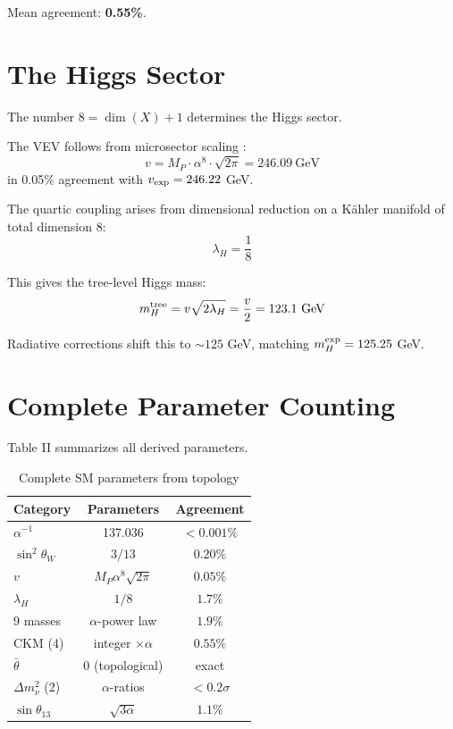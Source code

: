 \documentclass[aps,prl,twocolumn,superscriptaddress]{revtex4-2}
\begin{document}
Mean agreement: \textbf{0.55\%}.

\section{The Higgs Sector}

The number $8 = \dim(X) + 1$ determines the Higgs sector.

The VEV follows from microsector scaling \cite{DFD}:
\begin{equation}
v = M_P \cdot \alpha^8 \cdot \sqrt{2\pi} = 246.09~\text{GeV}
\end{equation}
in 0.05\% agreement with $v_{\rm exp} = 246.22$ GeV.

The quartic coupling arises from dimensional reduction on a K\"ahler
manifold of total dimension 8:
\begin{equation}
\lambda_H = \frac{1}{8}
\end{equation}

This gives the tree-level Higgs mass:
\begin{equation}
m_H^{\rm tree} = v\sqrt{2\lambda_H} = \frac{v}{2} = 123.1~\text{GeV}
\end{equation}

Radiative corrections shift this to $\sim 125$ GeV, matching
$m_H^{\rm exp} = 125.25$ GeV.

\section{Complete Parameter Counting}

Table II summarizes all derived parameters.

\begin{table}[h]
\caption{Complete SM parameters from topology}
\begin{ruledtabular}
\begin{tabular}{lcc}
Category & Parameters & Agreement \\
\hline
$\alpha^{-1}$ & 137.036 & $< 0.001\%$ \\
$\sin^2\theta_W$ & $3/13$ & $0.20\%$ \\
$v$ & $M_P \alpha^8 \sqrt{2\pi}$ & $0.05\%$ \\
$\lambda_H$ & $1/8$ & $1.7\%$ \\
9 masses & $\alpha$-power law & $1.9\%$ \\
CKM (4) & integer $\times \alpha$ & $0.55\%$ \\
$\bar{\theta}$ & 0 (topological) & exact \\
$\Delta m^2_\nu$ (2) & $\alpha$-ratios & $< 0.2\sigma$ \\
$\sin\theta_{13}$ & $\sqrt{3\alpha}$ & $1.1\%$ \\
\end{tabular}
\end{ruledtabular}
\end{table}
\end{document}
